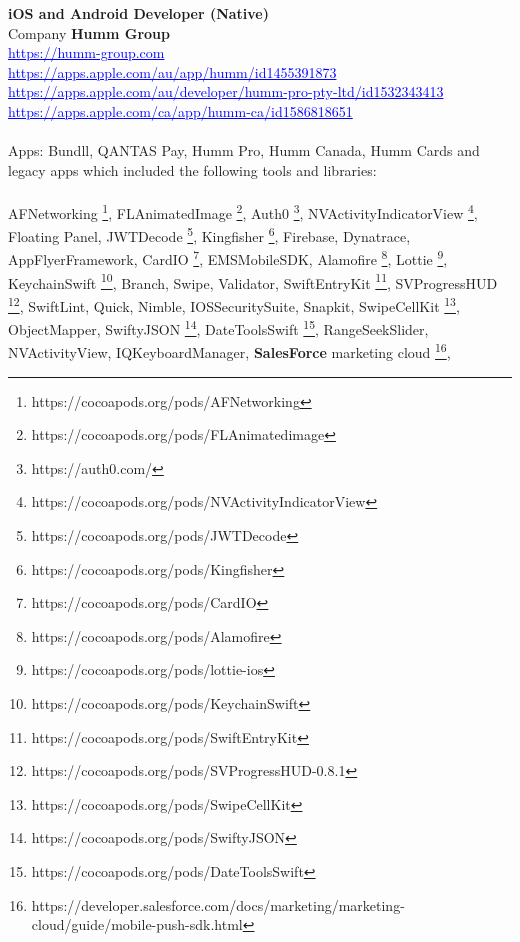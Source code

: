 \documentclass{article}
\let\svthefootnote\thefootnote
\newcommand\Cfootnote[2][black]{\def\thefootnote{\color{#1}\svthefootnote}%
  \footnote{\color{#1}#2}}
\begin{document}
\textbf{ iOS and Android Developer (Native) }  \\
Company  \textbf {Humm Group}  \\
\textcolor{blue} { \underline{  https://humm-group.com  } }  \\
\textcolor{blue} { \underline{ https://apps.apple.com/au/app/humm/id1455391873  } }  \\
\textcolor{blue} { \underline{ https://apps.apple.com/au/developer/humm-pro-pty-ltd/id1532343413  } }  \\
\textcolor{blue} { \underline{ https://apps.apple.com/ca/app/humm-ca/id1586818651 } }  \\
\\
Apps: Bundll, QANTAS Pay, Humm Pro, Humm Canada, Humm Cards and legacy apps which included the following tools and libraries:\\
\\
AFNetworking\Cfootnote[blue]{\label{afnet} https://cocoapods.org/pods/AFNetworking}, FLAnimatedImage\Cfootnote[blue]{https://cocoapods.org/pods/FLAnimatedimage}, Auth0\Cfootnote[blue]{\label{auth0}https://auth0.com/}, NVActivityIndicatorView\Cfootnote[blue]{https://cocoapods.org/pods/NVActivityIndicatorView}, Floating Panel, JWTDecode\Cfootnote[blue]{https://cocoapods.org/pods/JWTDecode}, Kingfisher\Cfootnote[blue]{https://cocoapods.org/pods/Kingfisher}, Firebase, Dynatrace, AppFlyerFramework, CardIO\Cfootnote[blue]{https://cocoapods.org/pods/CardIO}, EMSMobileSDK, Alamofire\Cfootnote[blue]{https://cocoapods.org/pods/Alamofire}, Lottie\Cfootnote[blue]{https://cocoapods.org/pods/lottie-ios}, 
KeychainSwift\Cfootnote[blue]{https://cocoapods.org/pods/KeychainSwift}, Branch, Swipe, Validator, SwiftEntryKit\Cfootnote[blue]{https://cocoapods.org/pods/SwiftEntryKit}, SVProgressHUD\Cfootnote[blue]{https://cocoapods.org/pods/SVProgressHUD-0.8.1}, SwiftLint, Quick, Nimble,  IOSSecuritySuite, Snapkit, SwipeCellKit\Cfootnote[blue]{https://cocoapods.org/pods/SwipeCellKit}, ObjectMapper, SwiftyJSON\Cfootnote[blue]{https://cocoapods.org/pods/SwiftyJSON}, DateToolsSwift\Cfootnote[blue]{https://cocoapods.org/pods/DateToolsSwift}, RangeSeekSlider, NVActivityView, IQKeyboardManager, \textbf{SalesForce} marketing cloud\Cfootnote[blue]{https://developer.salesforce.com/docs/marketing/marketing-cloud/guide/mobile-push-sdk.html},   
\end{document}
